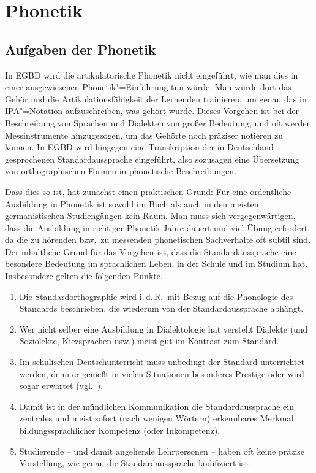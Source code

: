 \chapter{Phonetik}
\label{sec:phonetik}


\section{Aufgaben der Phonetik}
\label{sec:phonetik:aufgabenderphonetik}

In EGBD wird die artikulatorische Phonetik nicht eingeführt, wie man dies in einer ausgewiesenen Phonetik"=Einführung tun würde.
Man würde dort das Gehör und die Artikulationsfähigkeit der Lernenden trainieren, um genau das in IPA"=Notation aufzuschreiben, was gehört wurde.
Dieses Vorgehen ist bei der Beschreibung von Sprachen und Dialekten von großer Bedeutung, und oft werden Messinstrumente hinzugezogen, um das Gehörte noch präziser notieren zu können.
In EGBD wird hingegen eine Transkription der in Deutschland gesprochenen Standardaussprache eingeführt, also sozusagen eine Übersetzung von orthographischen Formen in phonetische Beschreibungen.

Dass dies so ist, hat zunächst einen praktischen Grund:
Für eine ordentliche Ausbildung in Phonetik ist sowohl im Buch als auch in den meisten germanistischen Studiengängen kein Raum.
Man muss sich vergegenwärtigen, dass die Ausbildung in richtiger Phonetik Jahre dauert und viel Übung erfordert, da die zu hörenden bzw.\ zu messenden phonetischen Sachverhalte oft subtil sind.
Der inhaltliche Grund für das Vorgehen ist, dass die Standardaussprache eine besondere Bedeutung im sprachlichen Leben, in der Schule und im Studium hat.
Insbesondere gelten die folgenden Punkte.

\begin{enumerate}
  \item Die Standardorthographie wird i.\,d.\,R.\ mit Bezug auf die Phonologie des Standards beschrieben, die wiederum von der Standardaussprache abhängt.
  \item Wer nicht selber eine Ausbildung in Dialektologie hat versteht Dialekte (und Soziolekte, Kiezsprachen usw.) meist gut im Kontrast zum Standard.
  \item Im schulischen Deutschunterricht muss unbedingt der Standard unterrichtet werden, denn er genießt in vielen Situationen besonderes Prestige oder wird sogar erwartet (vgl.\ \citealt[7]{KrechEa2009}).
  \item Damit ist in der mündlichen Kommunikation die Standardaussprache ein zentrales und meist sofort (nach wenigen Wörtern) erkennbares Merkmal bildungssprachlicher Kompetenz (oder Inkompetenz).
  \item Studierende -- und damit angehende Lehrpersonen -- haben oft keine präzise Vorstellung, wie genau die Standardaussprache kodifiziert ist.
\end{enumerate}

